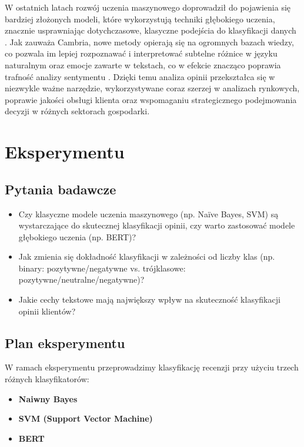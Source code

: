 \documentclass[runningheads]{llncs}
\begin{document}
W ostatnich latach rozwój uczenia maszynowego doprowadził do pojawienia się bardziej złożonych modeli, które wykorzystują techniki głębokiego uczenia, znacznie usprawniając dotychczasowe, klasyczne podejścia do klasyfikacji danych \cite{10.1155/2016/6965725}\cite{10.30534/ijeter/2020/46822020}. Jak zauważa Cambria, nowe metody opierają się na ogromnych bazach wiedzy, co pozwala im lepiej rozpoznawać i interpretować subtelne różnice w języku naturalnym oraz emocje zawarte w tekstach, co w efekcie znacząco poprawia trafność analizy sentymentu \cite{10.1109/mis.2013.30}. Dzięki temu analiza opinii przekształca się w niezwykle ważne narzędzie, wykorzystywane coraz szerzej w analizach rynkowych, poprawie jakości obsługi klienta oraz wspomaganiu strategicznego podejmowania decyzji w różnych sektorach gospodarki.

\section{Eksperymentu}
\subsection{Pytania badawcze}
\begin{itemize}
    \item Czy klasyczne modele uczenia maszynowego (np. Naïve Bayes, SVM) są wystarczające do skutecznej klasyfikacji opinii, czy warto zastosować modele głębokiego uczenia (np. BERT)?
    \item Jak zmienia się dokładność klasyfikacji w zależności od liczby klas (np. binary: pozytywne/negatywne vs. trójklasowe: pozytywne/neutralne/negatywne)?
    \item Jakie cechy tekstowe mają największy wpływ na skuteczność klasyfikacji opinii klientów?
    
\end{itemize}

\subsection{Plan eksperymentu}
W ramach eksperymentu przeprowadzimy klasyfikację recenzji przy użyciu trzech różnych klasyfikatorów:
\begin{itemize}
    \item \textbf{Naiwny Bayes}
    \item \textbf{SVM (Support Vector Machine)}
    \item \textbf{BERT}
\end{itemize}
\end{document}
